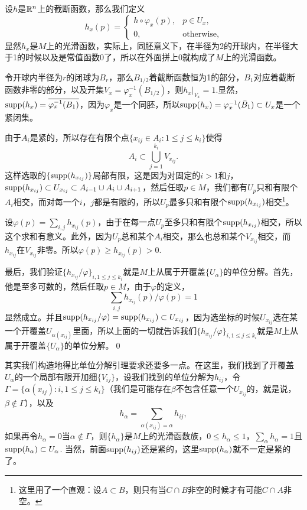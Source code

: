 设$h$是$\mathbb{R}^n$上的截断函数，那么我们定义
\[
	h_x(p)=\begin{cases}h\circ \varphi_x(p),& p\in U_x,\\
	0,&\text{otherwise},
	\end{cases}
\]
显然$h_x$是$M$上的光滑函数，实际上，同胚意义下，在半径为2的开球内，在半径大于1的时候以及是常值函数0了，所以在外面拼上0就构成了$M$上的光滑函数。

令开球内半径为$r$的闭球为$B_r$，那么$B_{1/2}$着截断函数恒为1的部分，$B_{1}$对应着截断函数非零的部分，以及开集$V_x=\varphi_x^{-1}(B_{1/2})$，则$h_x|_{V_x}=1$.显然，$\operatorname{supp}(h_{x})=\overline{\varphi_x^{-1}(B_1)}$，因为$\varphi_x$是一个同胚，所以$\operatorname{supp}(h_{x})=\varphi_x^{-1}(\bar{B}_1)\subset U_x$是一个紧闭集。

由于$A_i$是紧的，所以存在有限个点$\{x_{ij}\in A_i:1\leq j\leq k_i\}$使得
\[
	A_i\subset \bigcup_{j=1}^{k_i}V_{x_{ij}}.
\]
这样选取的$\{\operatorname{supp}(h_{x_{ij}})\}$局部有限，这是因为对固定的$i>1$和$j$，$\operatorname{supp}(h_{x_{ij}})\subset U_{x_{ij}}\subset A_{i-1}\cup A_i\cup A_{i+1}$，然后任取$p\in M$，我们都有$U_p$只和有限个$A_i$相交，而对每一个$i$，$j$都是有限的，所以$U_p$最多只和有限个$\operatorname{supp}(h_{x_{ij}})$相交\footnote{这里用了一个直观：设$A\subset B$，则只有当$C\cap B$非空的时候才有可能$C\cap A$非空。}。

设$\varphi(p)=\sum_{i,j}h_{x_{ij}}(p)$，由于在每一点$U_p$至多只和有限个$\operatorname{supp}(h_{x_{ij}})$相交，所以这个求和有意义。此外，因为$U_p$总和某个$A_i$相交，那么也总和某个$V_{x_{ij}}$相交，而$h_{x_{ij}}$在$V_{x_{ij}}$非零。所以$\varphi(p)\geq h_{x_{ij}}(p)>0$.

最后，我们验证$\{h_{x_{ij}}/\varphi\}_{i,1\leq j\leq k_i}$就是$M$上从属于开覆盖$\{U_\alpha\}$的单位分解。首先，他是至多可数的，然后任取$p\in M$，由于$\varphi$的定义，
\[
	\sum_{i,j}h_{x_{ij}}(p)/\varphi(p)=1
\]
显然成立。并且$\operatorname{supp}(h_{x_{ij}}/\varphi)=\operatorname{supp}(h_{x_{ij}})\subset U_{x_{ij}}$，因为选坐标的时候$U_{x_{ij}}$选在某一个开覆盖$U_{\alpha(x_{ij})}$里面，所以上面的一切就告诉我们$\{h_{x_{ij}}/\varphi\}_{i,1\leq j\leq k_i}$就是$M$上从属于开覆盖$\{U_\alpha\}$的单位分解。\qed

其实我们构造地得比单位分解引理要求还要多一点。在这里，我们找到了开覆盖$U_{\alpha}$的一个局部有限开加细$\{V_{ij}\}$，设我们找到的单位分解为$h_{ij}$，令$\Gamma=\{\alpha(x_{ij}):i,1\leq j\leq k_i\}$（我们是可能存在$\beta$不包含任意一个$U_{x_{ij}}$的，就是说，$\beta\notin \Gamma$），以及
\[
	h_{\alpha}=\sum_{\alpha(x_{ij})=\alpha}h_{ij},
\]
如果再令$h_{\alpha}=0$当$\alpha\notin \Gamma$，则$\{h_{\alpha}\}$是$M$上的光滑函数族，$0\leq h_\alpha\leq 1$，$\sum_{\alpha}h_\alpha=1$且$\operatorname{supp}(h_\alpha)\subset U_{\alpha}$. 当然，前面$\operatorname{supp}(h_{ij})$还是紧的，这里$\operatorname{supp}(h_\alpha)$就不一定是紧的了。


